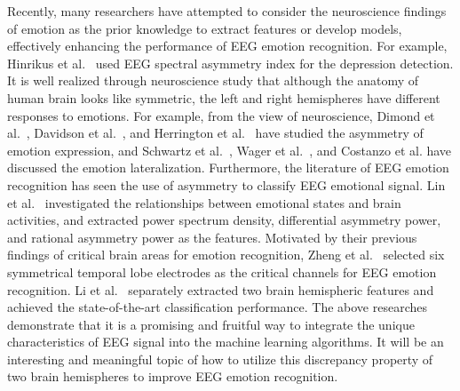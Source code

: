 \documentclass[journal]{IEEEtran}
\begin{document}
Recently, many researchers have attempted to consider the neuroscience findings of emotion as the prior knowledge to extract features or develop models, effectively enhancing the performance of EEG emotion recognition. For example, Hinrikus et al.~\cite{hinrikus2009electroencephalographic} used EEG spectral asymmetry index for the depression detection. It is well realized through neuroscience study that although the anatomy of human brain looks like symmetric, the left and right hemispheres have different responses to emotions. For example, from the view of neuroscience, Dimond et al.~\cite{dimond1976differing}, Davidson et al.~\cite{davidson1990approach}, and Herrington et al.~\cite{herrington2010localization} have studied the asymmetry of emotion expression, and Schwartz et al.~\cite{schwartz1975right}, Wager et al.~\cite{wager2003valence}, and Costanzo et al.\cite{costanzo2015hemispheric} have discussed the emotion lateralization. Furthermore, the literature of EEG emotion recognition has seen the use of asymmetry to classify EEG emotional signal. Lin et al.~\cite{lin2010eeg} investigated the relationships between emotional states and brain activities, and extracted power spectrum density, differential asymmetry power, and rational asymmetry power as the features. Motivated by their previous findings of critical brain areas for emotion recognition, Zheng et al.~\cite{zheng2018emotionmeter} selected six symmetrical temporal lobe electrodes as the critical channels for EEG emotion recognition. Li et al.~\cite{li2018bi} separately extracted two brain hemispheric features and achieved the state-of-the-art classification performance. The above researches demonstrate that it is a promising and fruitful way to integrate the unique characteristics of EEG signal into the machine learning algorithms. It will be an interesting and meaningful topic of how to utilize this discrepancy property of two brain hemispheres to improve EEG emotion recognition. 
\end{document}
